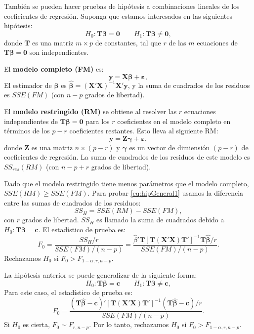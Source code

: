 \documentclass[
]{article}
\begin{document}
También se pueden hacer pruebas de hipótesis a combinaciones lineales de los coeficientes de regresión. Suponga que estamos interesados en las siguientes hipótesis:
\begin{equation}
H_{0}: \boldsymbol T\boldsymbol \beta=\boldsymbol 0\qquad H_{1}: \boldsymbol T\boldsymbol \beta\neq \boldsymbol 0,
\label{eq:hipGeneral1}
\end{equation}
donde \(\boldsymbol T\) es una matriz \(m \times p\) de constantes, tal que \(r\) de las \(m\) ecuaciones de \(\boldsymbol T\boldsymbol \beta=\boldsymbol 0\) son independientes.

El \textbf{modelo completo (FM)} es:
\[
\boldsymbol y=\boldsymbol X\boldsymbol \beta+\boldsymbol \varepsilon,
\]
El estimador de \(\boldsymbol \beta\) es \(\widehat{\boldsymbol \beta}= (\boldsymbol X'\boldsymbol X)^{-1}\boldsymbol X'\boldsymbol y\), y la suma de cuadrados de los residuos es \(SSE(FM)\) (con \(n-p\) grados de libertad).

El \textbf{modelo restringido (RM)} se obtiene al resolver las \(r\) ecuaciones independientes de \(\boldsymbol T\boldsymbol \beta= \boldsymbol 0\) para los \(r\) coeficientes en el modelo completo en términos de los \(p-r\) coeficientes restantes. Esto lleva al siguiente RM:
\[
\boldsymbol y=\boldsymbol Z\boldsymbol \gamma+\boldsymbol \varepsilon,
\]
donde \(\boldsymbol Z\) es una matriz \(n\times (p-r)\) y \(\boldsymbol \gamma\) es un vector de dimiensión \((p-r)\) de coeficientes de regresión. La suma de cuadrados de los residuos de este modelo es \(SS_{res}(RM)\) (con \(n-p+r\) grados de libertad).

Dado que el modelo restringido tiene menos parámetros que el modelo completo, \(SSE(RM) \geq SSE(FM)\). Para probar \eqref{eq:hipGeneral1} usamos la diferencia entre las sumas de cuadrados de los residuos:
\[
SS_{H} = SSE(RM) - SSE(FM),
\]
con \(r\) grados de libertad. \(SS_{H}\) es llamado la suma de cuadrados debido a \(H_{0}:\boldsymbol T\boldsymbol \beta=\boldsymbol c\). El estadístico de prueba es:
\[
F_{0} = \frac{SS_{H}/r}{SSE(FM)/(n-p)} = \frac{\widehat{\beta}'\boldsymbol T[\boldsymbol T(\boldsymbol X'\boldsymbol X)\boldsymbol T']^{-1}\boldsymbol T\widehat{\boldsymbol \beta}/r}{SSE(FM)/(n-p)}.
\]
Rechazamos \(H_{0}\) si \(F_{0} > F_{1-\alpha,r,n-p}\).

La hipótesis anterior se puede generalizar de la siguiente forma:
\begin{equation}
H_{0}: \boldsymbol T\boldsymbol \beta=\boldsymbol c\qquad H_{1}: \boldsymbol T\boldsymbol \beta\neq \boldsymbol c,
\label{eq:hipGeneral2}
\end{equation}
Para este caso, el estadístico de prueba es:
\[
 F_{0} = \frac{(\boldsymbol T\widehat{\boldsymbol \beta}-\boldsymbol c)'[\boldsymbol T(\boldsymbol X'\boldsymbol X)\boldsymbol T']^{-1}(\boldsymbol T\widehat{\boldsymbol \beta}-\boldsymbol c)/r}{SSE(FM)/(n-p)}.
\]
Si \(H_{0}\) es cierta, \(F_{0}\sim F_{r,n-p}\). Por lo tanto, rechazamos \(H_{0}\) si \(F_{0} > F_{1-\alpha,r,n-p}\).
\end{document}

